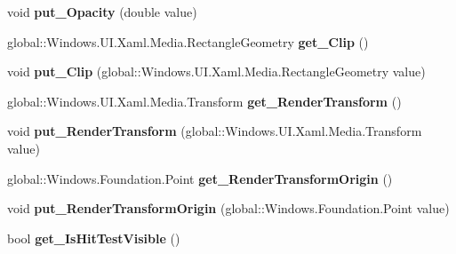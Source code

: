 \begin{DoxyCompactItemize}
void {\bfseries put\+\_\+\+Opacity} (double value)
\item 
\mbox{\label{interface_windows_1_1_u_i_1_1_xaml_1_1_i_u_i_element_a3ac32c6dc006288e8edab536fce2cba9}} 
global\+::\+Windows.\+U\+I.\+Xaml.\+Media.\+Rectangle\+Geometry {\bfseries get\+\_\+\+Clip} ()
\item 
\mbox{\label{interface_windows_1_1_u_i_1_1_xaml_1_1_i_u_i_element_afa52f92cfbfffd55b51a14f0f3174ebb}} 
void {\bfseries put\+\_\+\+Clip} (global\+::\+Windows.\+U\+I.\+Xaml.\+Media.\+Rectangle\+Geometry value)
\item 
\mbox{\label{interface_windows_1_1_u_i_1_1_xaml_1_1_i_u_i_element_ab552e7826e0d2d6d3c836b38db536820}} 
global\+::\+Windows.\+U\+I.\+Xaml.\+Media.\+Transform {\bfseries get\+\_\+\+Render\+Transform} ()
\item 
\mbox{\label{interface_windows_1_1_u_i_1_1_xaml_1_1_i_u_i_element_ac1ee0a38d70af19ef1629dff46ef59aa}} 
void {\bfseries put\+\_\+\+Render\+Transform} (global\+::\+Windows.\+U\+I.\+Xaml.\+Media.\+Transform value)
\item 
\mbox{\label{interface_windows_1_1_u_i_1_1_xaml_1_1_i_u_i_element_a5fa81294c9c6de8e157213ee727bd1c2}} 
global\+::\+Windows.\+Foundation.\+Point {\bfseries get\+\_\+\+Render\+Transform\+Origin} ()
\item 
\mbox{\label{interface_windows_1_1_u_i_1_1_xaml_1_1_i_u_i_element_a05d8af2ba53053be8810ef8ca2e32f36}} 
void {\bfseries put\+\_\+\+Render\+Transform\+Origin} (global\+::\+Windows.\+Foundation.\+Point value)
\item 
\mbox{\label{interface_windows_1_1_u_i_1_1_xaml_1_1_i_u_i_element_a08d625eccb089821ca78a7845cb5509c}} 
bool {\bfseries get\+\_\+\+Is\+Hit\+Test\+Visible} ()
\item 
\mbox{\label{interface_windows_1_1_u_i_1_1_xaml_1_1_i_u_i_element_aa80fb34be2e9e897b9dc8f558796ab51}} 

\end{DoxyCompactItemize}
